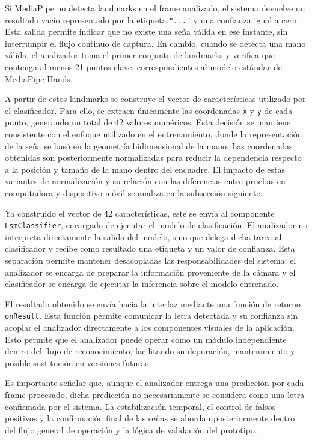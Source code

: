 	Si MediaPipe no detecta landmarks en el frame analizado, el sistema devuelve un resultado vacío representado por la etiqueta \texttt{"..."} y una confianza igual a cero. Esta salida permite indicar que no existe una seña válida en ese instante, sin interrumpir el flujo continuo de captura. En cambio, cuando se detecta una mano válida, el analizador toma el primer conjunto de landmarks y verifica que contenga al menos 21 puntos clave, correspondientes al modelo estándar de MediaPipe Hands.
	
	A partir de estos landmarks se construye el vector de características utilizado por el clasificador. Para ello, se extraen únicamente las coordenadas \texttt{x} y \texttt{y} de cada punto, generando un total de 42 valores numéricos. Esta decisión se mantiene consistente con el enfoque utilizado en el entrenamiento, donde la representación de la seña se basó en la geometría bidimensional de la mano. Las coordenadas obtenidas son posteriormente normalizadas para reducir la dependencia respecto a la posición y tamaño de la mano dentro del encuadre. El impacto de estas variantes de normalización y su relación con las diferencias entre pruebas en computadora y dispositivo móvil se analiza en la subsección siguiente.
	
	Ya construido el vector de 42 características, este se envía al componente \texttt{LsmClassifier}, encargado de ejecutar el modelo de clasificación. El analizador no interpreta directamente la salida del modelo, sino que delega dicha tarea al clasificador y recibe como resultado una etiqueta y un valor de confianza. Esta separación permite mantener desacopladas las responsabilidades del sistema: el analizador se encarga de preparar la información proveniente de la cámara y el clasificador se encarga de ejecutar la inferencia sobre el modelo entrenado.
	
	El resultado obtenido se envía hacia la interfaz mediante una función de retorno \texttt{onResult}. Esta función permite comunicar la letra detectada y su confianza sin acoplar el analizador directamente a los componentes visuales de la aplicación. Esto permite que el analizador puede operar como un módulo independiente dentro del flujo de reconocimiento, facilitando su depuración, mantenimiento y posible sustitución en versiones futuras.
	
	Es importante señalar que, aunque el analizador entrega una predicción por cada frame procesado, dicha predicción no necesariamente se considera como una letra confirmada por el sistema. La estabilización temporal, el control de falsos positivos y la confirmación final de las señas se abordan posteriormente dentro del flujo general de operación y la lógica de validación del prototipo. 
	
